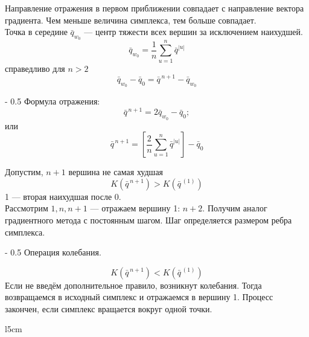 \documentclass[12pt,a5paper]{scrbook}
\makeatletter
\renewcommand\paragraph{\@startsection{paragraph}{4}{0mm}%
{-\baselineskip} %
{0.5\baselineskip} %
{\normalfont\bfseries}}%
\makeatother
\begin{document}
  Направление отражения в первом приближении совпадает с направление вектора градиента. Чем меньше величина симплекса, тем больше совпадает.\\
  
  Точка в середине $\bar{q}_{w_0}$ --- центр тяжести всех вершин за исключением наихудшей.
  $$\bar{q}_{w_0} = \frac{1}{n} \sum_{u=1}^{n} \bar{q}^{|u|}$$
  справедливо для $n>2$
  $$\bar{q}_{w_0} - \bar{q}_0 = \bar{q}^{\,n+1} - \bar{q}_{w_0}$$ 
  
  \paragraph{Формула отражения:}
  $$\bar{q}^{\,n+1} = 2\bar{q}_{w_0} - \bar{q}_0;$$
  или
  $$\bar{q}^{\,n+1} = \left[ \frac{2}{n}\sum_{u=1}^{n} \bar{q}^{|u|} \right] - \bar{q}_0$$
  
  Допустим, $n+1$ вершина не самая худшая
  $$K(\bar{q}^{\,n+1}) > K(\bar{q}^{\,(1)})$$
  1 --- вторая наихудшая после 0.\\
  
  Рассмотрим $1,n,n+1$ --- отражаем вершину 1: $n+2$. Получим аналог градиентного метода с постоянным шагом. Шаг определяется размером ребра симплекса.
  
  \paragraph{Операция колебания.}
  
  $$K(\bar{q}^{\,n+1}) < K(\bar{q}^{\,(1)})$$
  Если не введём дополнительное правило, возникнут колебания. Тогда возвращаемся в исходный симплекс и отражаемся в вершину 1. Процесс закончен, если симплекс вращается вокруг одной точки.\\
  
  \begin{wrapfigure}{l}{5cm}
  \end{wrapfigure}
  
\end{document}
